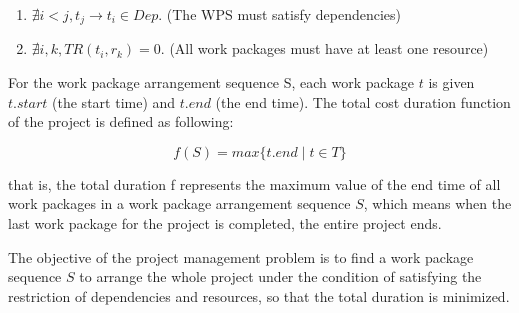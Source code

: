 \begin{enumerate}
\item $\nexists i < j, t_j \rightarrow t_i \in Dep$.
  (The WPS must satisfy dependencies)
\item $\nexists i, k, TR(t_i, r_k) = 0$.
  (All work packages must have at least one resource)
\end{enumerate}

For the work package arrangement sequence S, each work package $t$ is
given $t.start$ (the start time) and $t.end$ (the end time).  The
total cost duration function of the project is defined as following:

\begin{equation}
f(S) = max\{t.end \mid t \in T\}
\end{equation}

that is, the total duration f represents the maximum value of the end
time of all work packages in a work package arrangement sequence $S$,
which means when the last work package for the project is completed,
the entire project ends.

The objective of the project management problem is to find a work
package sequence $S$ to arrange the whole project under the condition
of satisfying the restriction of dependencies and resources, so that
the total duration is minimized.


